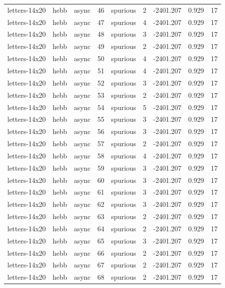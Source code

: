 \begin{tabular}{lllrlrrrr}
letters-14x20 & hebb & async & 46 & spurious & 2 & -2401.207 & 0.929 & 17 \\
letters-14x20 & hebb & async & 47 & spurious & 4 & -2401.207 & 0.929 & 17 \\
letters-14x20 & hebb & async & 48 & spurious & 3 & -2401.207 & 0.929 & 17 \\
letters-14x20 & hebb & async & 49 & spurious & 2 & -2401.207 & 0.929 & 17 \\
letters-14x20 & hebb & async & 50 & spurious & 4 & -2401.207 & 0.929 & 17 \\
letters-14x20 & hebb & async & 51 & spurious & 4 & -2401.207 & 0.929 & 17 \\
letters-14x20 & hebb & async & 52 & spurious & 3 & -2401.207 & 0.929 & 17 \\
letters-14x20 & hebb & async & 53 & spurious & 2 & -2401.207 & 0.929 & 17 \\
letters-14x20 & hebb & async & 54 & spurious & 5 & -2401.207 & 0.929 & 17 \\
letters-14x20 & hebb & async & 55 & spurious & 3 & -2401.207 & 0.929 & 17 \\
letters-14x20 & hebb & async & 56 & spurious & 3 & -2401.207 & 0.929 & 17 \\
letters-14x20 & hebb & async & 57 & spurious & 2 & -2401.207 & 0.929 & 17 \\
letters-14x20 & hebb & async & 58 & spurious & 4 & -2401.207 & 0.929 & 17 \\
letters-14x20 & hebb & async & 59 & spurious & 3 & -2401.207 & 0.929 & 17 \\
letters-14x20 & hebb & async & 60 & spurious & 3 & -2401.207 & 0.929 & 17 \\
letters-14x20 & hebb & async & 61 & spurious & 3 & -2401.207 & 0.929 & 17 \\
letters-14x20 & hebb & async & 62 & spurious & 3 & -2401.207 & 0.929 & 17 \\
letters-14x20 & hebb & async & 63 & spurious & 2 & -2401.207 & 0.929 & 17 \\
letters-14x20 & hebb & async & 64 & spurious & 2 & -2401.207 & 0.929 & 17 \\
letters-14x20 & hebb & async & 65 & spurious & 3 & -2401.207 & 0.929 & 17 \\
letters-14x20 & hebb & async & 66 & spurious & 2 & -2401.207 & 0.929 & 17 \\
letters-14x20 & hebb & async & 67 & spurious & 2 & -2401.207 & 0.929 & 17 \\
letters-14x20 & hebb & async & 68 & spurious & 2 & -2401.207 & 0.929 & 17 \\

\end{tabular}

